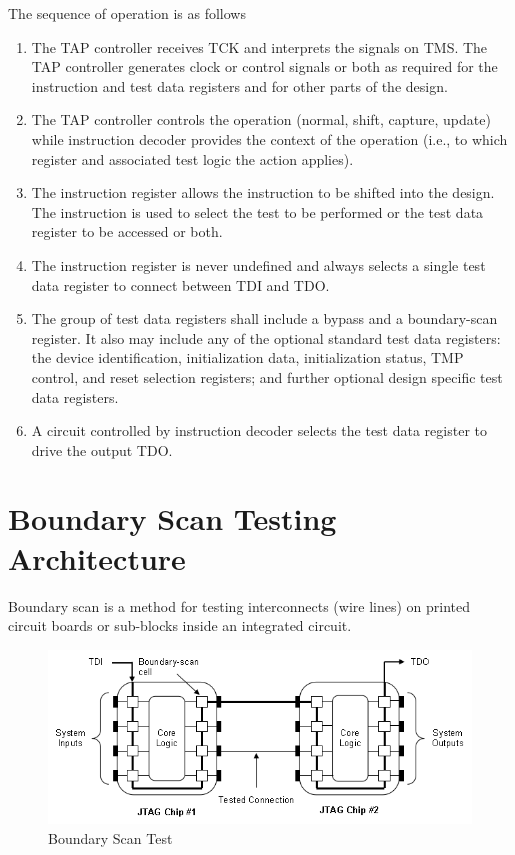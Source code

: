 The sequence of operation is as follows

\begin{enumerate}
    \item The TAP controller receives TCK and interprets the signals on TMS. The TAP controller generates clock or control signals or both as required for the instruction and test data registers and for other parts of the design.
    \item  The TAP controller controls the operation (normal, shift, capture, update) while instruction decoder provides the context of the operation (i.e., to which register and associated test logic the action applies).
    \item The instruction register allows the instruction to be shifted into the design. The instruction is used to select the test to be performed or the test data register to be accessed or both.
    \item The instruction register is never undefined and always selects a single test data register to connect between TDI and TDO.
    \item The group of test data registers shall include a bypass and a boundary-scan register. It also may include any of the optional standard test data registers: the device identification, initialization data, initialization status, TMP control, and reset selection registers; and further optional design specific test data registers. 
    \item A circuit controlled by instruction decoder selects the test data register to drive the output TDO.
\end{enumerate}

\section{Boundary Scan Testing Architecture}
\label{sec:bst-arhitecture}

Boundary scan is a method for testing interconnects (wire lines) on printed circuit boards or sub-blocks inside an integrated circuit. 

\vspace{1cm}
\begin{figure}[H]
    \centering
    \includegraphics[width = 14cm]{images/boundary_scan_test.png}
    \vspace{1cm}
    \caption{Boundary Scan Test}
    \label{fig:bst}
\end{figure}
\vspace{1cm}

